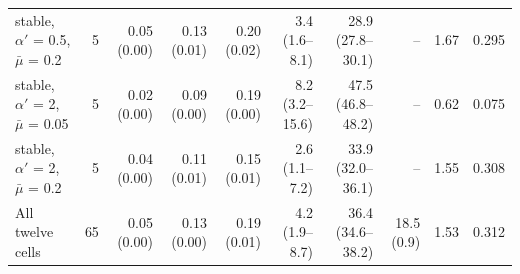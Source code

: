 \documentclass[10pt,a4paper]{article}
\begin{document}
\begin{minipage}{\linewidth}
\begin{tabular}{lrrrrrrrrr}
stable, $\alpha'$ = 0.5, $\bar{\mu}$ = 0.2 & 5 & 0.05 (0.00) & 0.13 (0.01) & 0.20 (0.02) & 3.4 (1.6–8.1) & 28.9 (27.8–30.1) & – & 1.67 & 0.295 \\
stable, $\alpha'$ = 2, $\bar{\mu}$ = 0.05 & 5 & 0.02 (0.00) & 0.09 (0.00) & 0.19 (0.00) & 8.2 (3.2–15.6) & 47.5 (46.8–48.2) & – & 0.62 & 0.075 \\
stable, $\alpha'$ = 2, $\bar{\mu}$ = 0.2 & 5 & 0.04 (0.00) & 0.11 (0.01) & 0.15 (0.01) & 2.6 (1.1–7.2) & 33.9 (32.0–36.1) & – & 1.55 & 0.308 \\
\midrule
All twelve cells & 65 & 0.05 (0.00) & 0.13 (0.00) & 0.19 (0.01) & 4.2 (1.9–8.7) & 36.4 (34.6–38.2) & 18.5 (0.9) & 1.53 & 0.312 \\
\bottomrule
\end{tabular}
\end{minipage}
\vspace{22pt}
\end{document}
